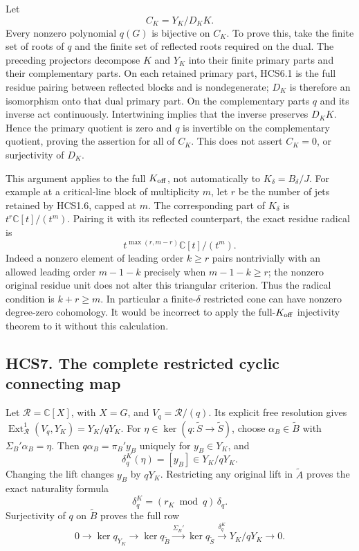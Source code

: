 Let \[
C_K=Y_K/D_KK.
\tag{HCS6.3}
\] Every nonzero polynomial \(q(G)\) is bijective on \(C_K\). To prove
this, take the finite set of roots of \(q\) and the finite set of
reflected roots required on the dual. The preceding projectors decompose
\(K\) and \(Y_K\) into their finite primary parts and their
complementary parts. On each retained primary part, HCS6.1 is the full
residue pairing between reflected blocks and is nondegenerate; \(D_K\)
is therefore an isomorphism onto that dual primary part. On the
complementary parts \(q\) and its inverse act continuously. Intertwining
implies that the inverse preserves \(D_KK\). Hence the primary quotient
is zero and \(q\) is invertible on the complementary quotient, proving
the assertion for all of \(C_K\). This does not assert \(C_K=0\), or
surjectivity of \(D_K\).

This argument applies to the full \(K_{\rm off}\), not automatically to
\(K_\delta=B_\delta/J\). For example at a critical-line block of
multiplicity \(m\), let \(r\) be the number of jets retained by HCS1.6,
capped at \(m\). The corresponding part of \(K_\delta\) is
\(t^r\mathbb C[t]/(t^m)\). Pairing it with its reflected counterpart,
the exact residue radical is \[
t^{\max(r,m-r)}\mathbb C[t]/(t^m).
\tag{HCS6.4}
\] Indeed a nonzero element of leading order \(k\ge r\) pairs
nontrivially with an allowed leading order \(m-1-k\) precisely when
\(m-1-k\ge r\); the nonzero original residue unit does not alter this
triangular criterion. Thus the radical condition is \(k+r\ge m\). In
particular a finite-\(\delta\) restricted cone can have nonzero
degree-zero cohomology. It would be incorrect to apply the
full-\(K_{\rm off}\) injectivity theorem to it without this calculation.

\subsection{HCS7. The complete restricted cyclic connecting
map}\label{hcs7.-the-complete-restricted-cyclic-connecting-map}

Let \(\mathcal R=\mathbb C[X]\), with \(X=G\), and
\(V_q=\mathcal R/(q)\). Its explicit free resolution gives
\(\operatorname{Ext}^1_{\mathcal R}(V_q,Y_K)=Y_K/qY_K\). For
\(\eta\in\ker(q:\widetilde S\to\widetilde S)\), choose
\(\alpha_B\in\widetilde B\) with \(\Sigma_B'\alpha_B=\eta\). Then
\(q\alpha_B=\pi_B'y_B\) uniquely for \(y_B\in Y_K\), and \[
\delta_q^K(\eta)=[y_B]\in Y_K/qY_K.
\tag{HCS7.1}
\] Changing the lift changes \(y_B\) by \(qY_K\). Restricting any
original lift in \(\widetilde A\) proves the exact naturality formula \[
\boxed{\delta_q^K=(r_K\bmod q)\,\delta_q.}
\tag{HCS7.2}
\] Surjectivity of \(q\) on \(\widetilde B\) proves the full row \[
0\to\ker q_{Y_K}\to\ker q_{\widetilde B}
\xrightarrow{\Sigma_B'}\ker q_{\widetilde S}
\xrightarrow{\delta_q^K}Y_K/qY_K\to0.
\tag{HCS7.3}
\]

